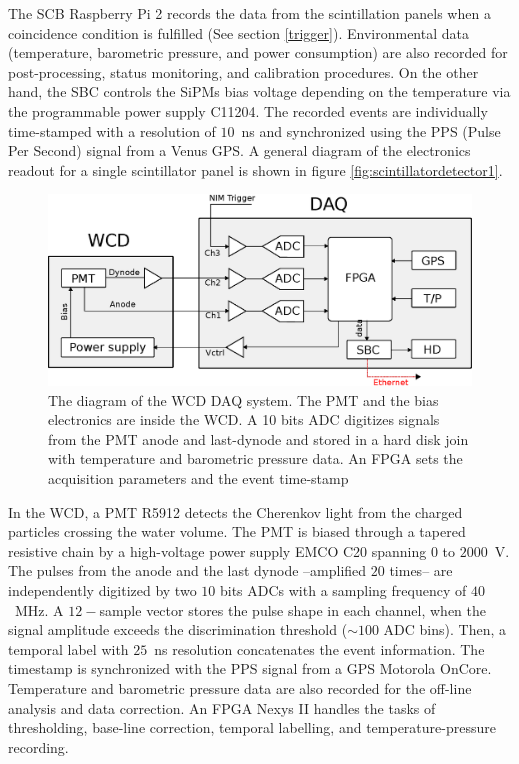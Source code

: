 \documentclass[letterpaper,11pt]{article}
\begin{document}
The SCB Raspberry Pi 2 records the data from the scintillation panels when a coincidence condition is fulfilled (See section \ref{trigger}). Environmental data (temperature, barometric pressure, and power consumption) are also recorded for post-processing, status monitoring, and calibration procedures. On the other hand, the SBC controls the SiPMs bias voltage depending on the temperature via the programmable power supply C11204. The recorded events are individually time-stamped with a resolution of $10$~ns and synchronized using the PPS (Pulse Per Second) signal from a Venus GPS. A general diagram of the electronics readout for a single scintillator panel is shown in figure \ref{fig:scintillatordetector1}.

\begin{figure}[htb]
\centering
\includegraphics[width=0.9\columnwidth]{Figures/WCDDAQ.eps}
\caption{The diagram of the WCD DAQ system. The PMT and the bias electronics are inside the WCD. A 10 bits ADC digitizes signals from the PMT anode and last-dynode and stored in a hard disk join with temperature and barometric pressure data. An FPGA sets the acquisition parameters and the event time-stamp}
  \label{fig:WCD}
\end{figure}

In the WCD, a PMT R5912 detects the Cherenkov light from the charged particles crossing the water volume. The PMT is biased through a tapered resistive chain by a high-voltage power supply EMCO C20 spanning $0$ to $2000$~V. The pulses from the anode and the last dynode --amplified $20$ times-- are independently digitized by two $10$ bits ADCs with a sampling frequency of $40$~MHz. A $12-$sample vector stores the pulse shape in each channel,  when the signal amplitude exceeds the discrimination threshold ($\sim 100$ ADC bins).  Then, a temporal label with $25$~ns resolution concatenates the event information. The timestamp is synchronized with the PPS signal from a GPS Motorola OnCore. Temperature and barometric pressure data are also recorded for the off-line analysis and data correction. An FPGA Nexys II handles the tasks of thresholding, base-line correction, temporal labelling, and temperature-pressure recording.
\end{document}
